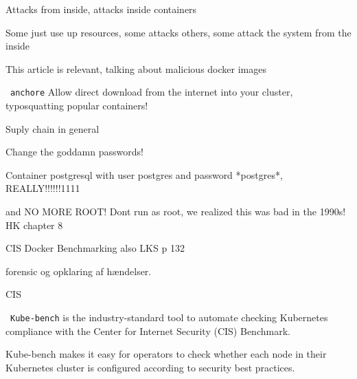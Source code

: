 \documentclass[Screen16to9,17pt]{foils}
\begin{document}
Attacks from inside, attacks inside containers

Some just use up resources, some attacks others, some attack the system from the inside



This article is relevant, talking about malicious docker images


\begin{list2}
\item \faWrench\ \verb+anchore+
Allow direct download from the internet into your cluster, typosquatting popular containers!

\item Suply chain in general
\end{list2}


\begin{list2}
\item
\end{list2}
Change the goddamn passwords!

Container postgresql with user postgres and password *postgres*, REALLY!!!!!!1111

and NO MORE ROOT! Dont run as root, we realized this was bad in the 1990s!
HK chapter 8

CIS Docker Benchmarking also LKS p 132





\begin{list2}
\item
\end{list2}
forensic og opklaring af hændelser.



\begin{list2}
\item
\end{list2}

CIS

\faWrench\ \verb+Kube-bench+ is the industry-standard tool to automate checking Kubernetes compliance with the Center for Internet Security (CIS) Benchmark.

Kube-bench makes it easy for operators to check whether each node in their Kubernetes cluster is configured according to security best practices.
\end{document}
